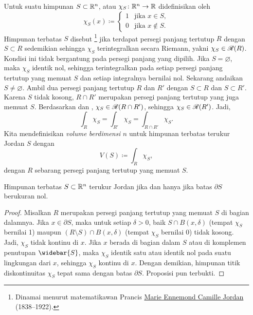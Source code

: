 Untuk suatu himpunan
$S \subset {\mathbb{R}}^n$, \emph{}
atau \emph{} $\chi_S \colon {\mathbb{R}}^n \to {\mathbb{R}}$
didefinisikan oleh
\begin{equation*}
\chi_S(x) \coloneqq
\begin{cases}
1 & \text{jika } x \in S, \\
0 & \text{jika } x \notin S.
\end{cases}
\end{equation*}
Himpunan terbatas $S$ disebut \emph{}\footnote{Dinamai
menurut matematikawan Prancis
\href{https://en.wikipedia.org/wiki/Camille_Jordan}{Marie Ennemond Camille Jordan}
(1838--1922).}
jika terdapat persegi panjang tertutup $R$ dengan $S \subset R$ sedemikian
sehingga $\chi_S$ terintegralkan secara Riemann, yakni
$\chi_S \in {\mathscr{R}}(R)$.
Kondisi ini tidak bergantung pada persegi panjang yang dipilih. Jika
$S=\varnothing$, maka $\chi_S$ identik nol, sehingga terintegralkan pada setiap
persegi panjang tertutup yang memuat $S$ dan setiap integralnya bernilai nol.
Sekarang andaikan $S \neq \varnothing$. Ambil dua persegi panjang tertutup
$R$ dan $R'$ dengan $S \subset R$ dan $S \subset R'$. Karena $S$ tidak kosong,
$R \cap R'$ merupakan persegi panjang tertutup yang juga memuat $S$.
Berdasarkan  dan
, $\chi_S \in {\mathscr{R}}(R \cap R')$, sehingga
$\chi_S \in {\mathscr{R}}(R')$. Jadi,
\begin{equation*}
\int_R \chi_S = \int_{R'} \chi_S = \int_{R \cap R'} \chi_S.
\end{equation*}
Kita mendefinisikan
\emph{volume berdimensi $n$}%
%
untuk himpunan terbatas terukur Jordan $S$ dengan
\begin{equation*}
V(S) \coloneqq \int_R \chi_S ,
\end{equation*}
dengan $R$ sebarang persegi panjang tertutup yang memuat $S$.

\begin{prop}
Himpunan terbatas $S \subset {\mathbb{R}}^n$ terukur Jordan jika dan hanya jika
batas $\partial S$ berukuran nol.
\end{prop}

\begin{proof}
Misalkan $R$ merupakan persegi panjang tertutup yang memuat $S$ di bagian
dalamnya. Jika $x \in \partial S$, maka untuk setiap $\delta > 0$, baik
$S \cap B(x,\delta)$ (tempat $\chi_S$ bernilai 1) maupun
$(R \setminus S) \cap B(x,\delta)$ (tempat $\chi_S$ bernilai 0) tidak kosong.
Jadi, $\chi_S$ tidak kontinu di $x$. Jika $x$ berada di bagian dalam $S$ atau
di komplemen penutupan $\widebar{S}$, maka $\chi_S$ identik satu atau identik
nol pada suatu lingkungan dari $x$, sehingga $\chi_S$ kontinu di $x$.
Dengan demikian, himpunan titik diskontinuitas $\chi_S$ tepat sama dengan
batas $\partial S$. Proposisi pun terbukti.
\end{proof}


